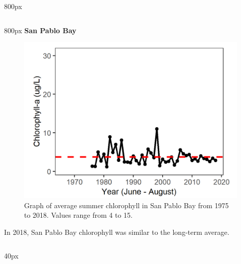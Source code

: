 \documentclass[
]{book}
\begin{document}
\begin{column}{800px\textwidth}
\end{column}

\begin{column}{800px\textwidth}
\textbf{San Pablo Bay}

\begin{figure}
\includegraphics[width=15.25in]{figures/chla_splsummer} \caption{Graph of average summer chlorophyll in San Pablo Bay from 1975 to 2018. Values range from 4 to 15.}\label{fig:unnamed-chunk-63}
\end{figure}

In 2018, San Pablo Bay chlorophyll was similar to the long-term average.
\end{column}

\begin{column}{40px\textwidth}
~
\end{column}
\end{document}
